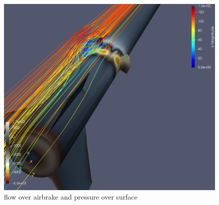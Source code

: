 \documentclass[11pt, a4paper]{article}
\begin{document}
\begin{figure}[ht]
\begin{minipage}[b]{.45\textwidth}
\end{minipage}
\hfill
\begin{center}
\begin{minipage}[b]{.45\textwidth}
\centering
\includegraphics[scale=0.09]{brakes4}
\captionsetup{labelsep=space,justification=justified,singlelinecheck=off}
\caption{flow over airbrake and pressure over surface}
\end{minipage}
\end{center}


\end{figure}
\end{document}
